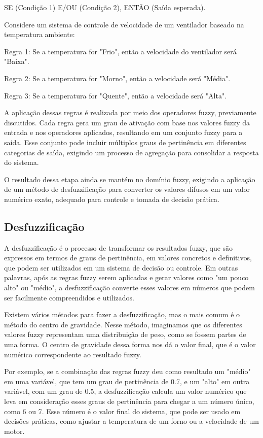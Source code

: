 \documentclass[12pt]{article}
\begin{document}
    SE (Condição 1) E/OU (Condição 2), ENTÃO (Saída esperada).

Considere um sistema de controle de velocidade de um ventilador baseado na temperatura ambiente:

    Regra 1: Se a temperatura for "Frio", então a velocidade do ventilador será "Baixa".
    
    Regra 2: Se a temperatura for "Morno", então a velocidade será "Média".
    
    Regra 3: Se a temperatura for "Quente", então a velocidade será "Alta".

A aplicação dessas regras é realizada por meio dos operadores fuzzy, previamente discutidos. Cada regra gera um grau de ativação com base nos valores fuzzy da entrada e nos operadores aplicados, resultando em um conjunto fuzzy para a saída. Esse conjunto pode incluir múltiplos graus de pertinência em diferentes categorias de saída, exigindo um processo de agregação para consolidar a resposta do sistema.

O resultado dessa etapa ainda se mantém no domínio fuzzy, exigindo a aplicação de um método de desfuzzificação para converter os valores difusos em um valor numérico exato, adequado para controle e tomada de decisão prática.

\subsection{Desfuzzificação}

A desfuzzificação é o processo de transformar os resultados fuzzy, que são expressos em termos de graus de pertinência, em valores concretos e definitivos, que podem ser utilizados em um sistema de decisão ou controle. Em outras palavras, após as regras fuzzy serem aplicadas e gerar valores como "um pouco alto" ou "médio", a desfuzzificação converte esses valores em números que podem ser facilmente compreendidos e utilizados.

Existem vários métodos para fazer a desfuzzificação, mas o mais comum é o método do centro de gravidade. Nesse método, imaginamos que os diferentes valores fuzzy representam uma distribuição de peso, como se fossem partes de uma forma. O centro de gravidade dessa forma nos dá o valor final, que é o valor numérico correspondente ao resultado fuzzy.

Por exemplo, se a combinação das regras fuzzy deu como resultado um "médio" em uma variável, que tem um grau de pertinência de 0.7, e um "alto" em outra variável, com um grau de 0.5, a desfuzzificação calcula um valor numérico que leva em consideração esses graus de pertinência para chegar a um número único, como 6 ou 7. Esse número é o valor final do sistema, que pode ser usado em decisões práticas, como ajustar a temperatura de um forno ou a velocidade de um motor.
\end{document}
